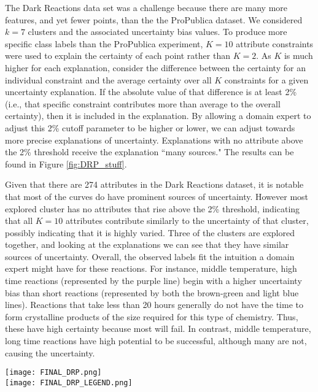 The Dark Reactions data set was a challenge because there are many more features, and yet fewer points, than the the ProPublica dataset. We considered $k = 7$ clusters and the associated uncertainty bias values. To produce more specific class labels than the ProPublica experiment, $K=10$ attribute constraints were used to explain the certainty of each point rather than $K=2$.  As $K$ is much higher for each explanation, consider the difference between the certainty for an individual constraint and the average certainty over all $K$ constraints for a given uncertainty explanation.  If the absolute value of that difference is at least 2\% (i.e., that specific constraint contributes more than average to the overall certainty), then it is included in the explanation.  By allowing a domain expert to adjust this 2\% cutoff parameter to be higher or lower, we can adjust towards more precise explanations of uncertainty.  Explanations with no attribute above the 2\% threshold receive the explanation ``many sources."  The results can be found in Figure \ref{fig:DRP_stuff}.

 Given that there are 274 attributes in the Dark Reactions dataset, it is notable that most of the curves do have prominent sources of uncertainty.  However most explored cluster has no attributes that rise above the 2\% threshold, indicating that all $K=10$ attributes contribute similarly to the uncertainty of that cluster, possibly indicating that it is highly varied.  Three of the clusters are explored together, and looking at the explanations we can see that they have similar sources of uncertainty.  Overall, the observed labels fit the intuition a domain expert might have for these reactions.  For instance, middle temperature, high time reactions (represented by the purple line) begin with a higher uncertainty bias than short reactions (represented by both the brown-green and light blue lines). Reactions that take less than 20 hours generally do not have the time to form crystalline products of the size required for this type of chemistry. Thus, these have high certainty because most will fail. In contrast, middle temperature, long time reactions have high potential to be successful, although many are not, causing the uncertainty.


\begin{figure*}[h]
\centering
\texttt{[image: FINAL\_DRP.png]}\\
\texttt{[image: FINAL\_DRP\_LEGEND.png]}
\caption{Left: Counts labeled from each of the seven automatically-generated clusters for the Dark Reactions dataset. Right: Corresponding uncertainty bias values for the top six most queried clusters for the logistic regression model trained at each step.}
\label{fig:DRP_stuff}
\end{figure*}


